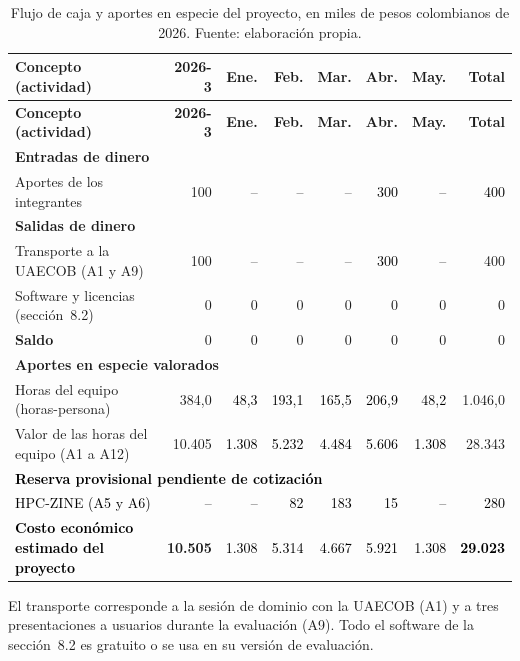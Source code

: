 \begin{longtable}{|p{}|r|r|r|r|r|r|r|}
\caption{Flujo de caja y aportes en especie del proyecto, en miles de pesos colombianos de 2026. Fuente: elaboración propia.}\label{tab:flujo-caja}\\
\hline
\textbf{Concepto (actividad)} & \textbf{2026-3} & \textbf{Ene.} & \textbf{Feb.} & \textbf{Mar.} & \textbf{Abr.} & \textbf{May.} & \textbf{Total}\tabularnewline\hline
\endfirsthead
\hline
\textbf{Concepto (actividad)} & \textbf{2026-3} & \textbf{Ene.} & \textbf{Feb.} & \textbf{Mar.} & \textbf{Abr.} & \textbf{May.} & \textbf{Total}\tabularnewline\hline
\endhead
\multicolumn{8}{|l|}{\textbf{Entradas de dinero}}\tabularnewline\hline
\raggedright Aportes de los integrantes & 100 & -- & \textcolor{black}{--} & -- & \textcolor{black}{300} & \textcolor{black}{--} & \textcolor{black}{400}\tabularnewline\hline
\multicolumn{8}{|l|}{\textbf{Salidas de dinero}}\tabularnewline\hline
\raggedright Transporte a la UAECOB (A1 y A9) & 100 & -- & -- & -- & \textcolor{black}{300} & \textcolor{black}{--} & 400\tabularnewline\hline
\raggedright Software y licencias (sección~8.2) & 0 & 0 & 0 & 0 & 0 & 0 & 0\tabularnewline\hline
\raggedright \textbf{Saldo} & 0 & 0 & 0 & 0 & 0 & 0 & 0\tabularnewline\hline
\multicolumn{8}{|l|}{\textbf{Aportes en especie valorados}}\tabularnewline\hline
\raggedright Horas del equipo (horas-persona) & 384,0 & \textcolor{black}{48,3} & \textcolor{black}{193,1} & \textcolor{black}{165,5} & \textcolor{black}{206,9} & \textcolor{black}{48,2} & 1.046,0\tabularnewline\hline
\raggedright Valor de las horas del equipo (A1 a A12) & 10.405 & \textcolor{black}{1.308} & \textcolor{black}{5.232} & \textcolor{black}{4.484} & \textcolor{black}{5.606} & \textcolor{black}{1.308} & 28.343\tabularnewline\hline
\multicolumn{8}{|l|}{\textbf{\textcolor{black}{Reserva provisional pendiente de cotización}}}\tabularnewline\hline
\raggedright \textcolor{black}{HPC-ZINE (A5 y A6)} & \textcolor{black}{--} & \textcolor{black}{--} & \textcolor{black}{82} & \textcolor{black}{183} & \textcolor{black}{15} & \textcolor{black}{--} & \textcolor{black}{280}\tabularnewline\hline
\raggedright \textbf{\textcolor{black}{Costo económico estimado del proyecto}} & \textbf{10.505} & \textcolor{black}{1.308} & \textcolor{black}{5.314} & \textcolor{black}{4.667} & \textcolor{black}{5.921} & \textcolor{black}{1.308} & \textbf{\textcolor{black}{29.023}}\tabularnewline\hline
\end{longtable}
 
El transporte corresponde a la sesión de dominio con la UAECOB (A1) y a tres presentaciones a usuarios durante la evaluación (A9). Todo el software de la sección~8.2 es gratuito o se usa en su versión de evaluación.
 
